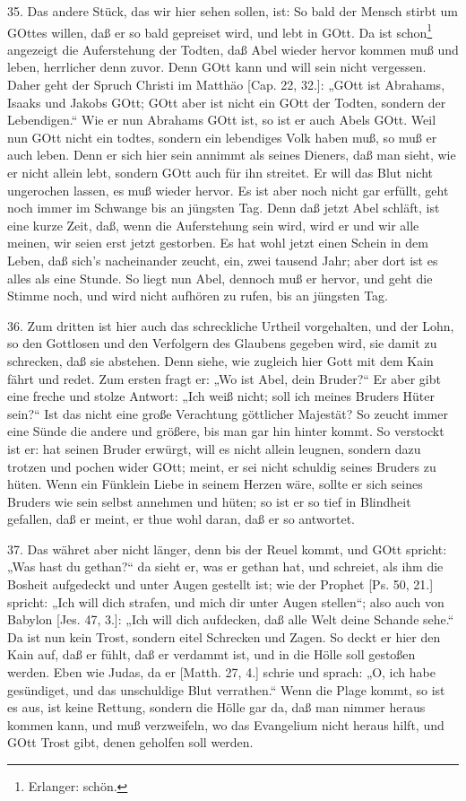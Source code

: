 35. Das andere Stück, das wir hier sehen sollen, ist: So bald der Mensch stirbt um GOttes willen, daß er so bald gepreiset wird, und lebt in GOtt. Da ist schon\footnote{Erlanger: schön.} angezeigt die Auferstehung der Todten, daß Abel wieder hervor kommen muß und leben, herrlicher denn zuvor. Denn GOtt kann und will sein nicht vergessen. Daher geht der Spruch Christi im Matthäo [Cap. 22, 32.]: „GOtt ist Abrahams, Isaaks und Jakobs GOtt; GOtt aber ist nicht ein GOtt der Todten, sondern der Lebendigen.“ Wie er nun Abrahams GOtt ist, so ist er auch Abels GOtt. Weil nun GOtt nicht ein todtes, sondern ein lebendiges Volk haben muß, so muß er auch leben. Denn er sich hier sein annimmt als seines Dieners, daß man sieht, wie er nicht allein lebt, sondern GOtt auch für ihn streitet. Er will das Blut nicht ungerochen lassen, es muß wieder hervor. Es ist aber noch nicht gar erfüllt, geht noch immer im Schwange bis an jüngsten Tag. Denn daß jetzt Abel schläft, ist eine kurze Zeit, daß, wenn die Auferstehung sein wird, wird er und wir alle meinen, wir seien erst jetzt gestorben. Es hat wohl jetzt einen Schein in dem Leben, daß sich’s nacheinander zeucht, ein, zwei tausend Jahr; aber dort ist es alles als eine Stunde. So liegt nun Abel, dennoch muß er hervor, und geht die Stimme noch, und wird nicht aufhören zu rufen, bis an jüngsten Tag.

36. Zum dritten ist hier auch das schreckliche Urtheil vorgehalten, und der Lohn, so den Gottlosen und den Verfolgern des Glaubens gegeben wird, sie damit zu schrecken, daß sie abstehen. Denn siehe, wie zugleich hier Gott mit dem Kain fährt und redet. Zum ersten fragt er: „Wo ist Abel, dein Bruder?“ Er aber gibt eine freche und stolze Antwort: „Ich weiß nicht; soll ich meines Bruders Hüter sein?“ Ist das nicht eine große Verachtung göttlicher Majestät? So zeucht immer eine Sünde die andere und größere, bis man gar hin hinter kommt. So verstockt ist er: hat seinen Bruder erwürgt, will es nicht allein leugnen, sondern dazu trotzen und pochen wider GOtt; meint, er sei nicht schuldig seines Bruders zu hüten. Wenn ein Fünklein Liebe in seinem Herzen wäre, sollte er sich seines Bruders wie sein selbst annehmen und hüten; so ist er so tief in Blindheit gefallen, daß er meint, er thue wohl daran, daß er so antwortet.

37. Das währet aber nicht länger, denn bis der Reuel kommt, und GOtt spricht: „Was hast du gethan?“ da sieht er, was er gethan hat, und schreiet, als ihm die Bosheit aufgedeckt und unter Augen gestellt ist; wie der Prophet [Ps. 50, 21.] spricht: „Ich will dich strafen, und mich dir unter Augen stellen“; also auch von Babylon [Jes. 47, 3.]: „Ich will dich aufdecken, daß alle Welt deine Schande sehe.“ Da ist nun kein Trost, sondern eitel Schrecken und Zagen. So deckt er hier den Kain auf, daß er fühlt, daß er verdammt ist, und in die Hölle soll gestoßen werden. Eben wie Judas, da er [Matth. 27, 4.] schrie und sprach: „O, ich habe gesündiget, und das unschuldige Blut verrathen.“ Wenn die Plage kommt, so ist es aus, ist keine Rettung, sondern die Hölle gar da, daß man nimmer heraus kommen kann, und muß verzweifeln, wo das Evangelium nicht heraus hilft, und GOtt Trost gibt, denen geholfen soll werden.


